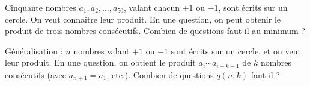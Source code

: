 Cinquante nombres $a_1, a_2, \ldots, a_{50}$, valant chacun $+1$ ou $-1$, sont écrits sur un cercle. On veut connaître leur produit. En une question, on peut obtenir le produit de trois nombres consécutifs. Combien de questions faut-il au minimum ?

Généralisation : $n$ nombres valant $+1$ ou $-1$ sont écrits sur un cercle, et on veut leur produit. En une question, on obtient le produit $a_i \cdots a_{i+k-1}$ de $k$ nombres consécutifs (avec $a_{n+1} = a_1$, etc.). Combien de questions $q(n, k)$ faut-il ?
